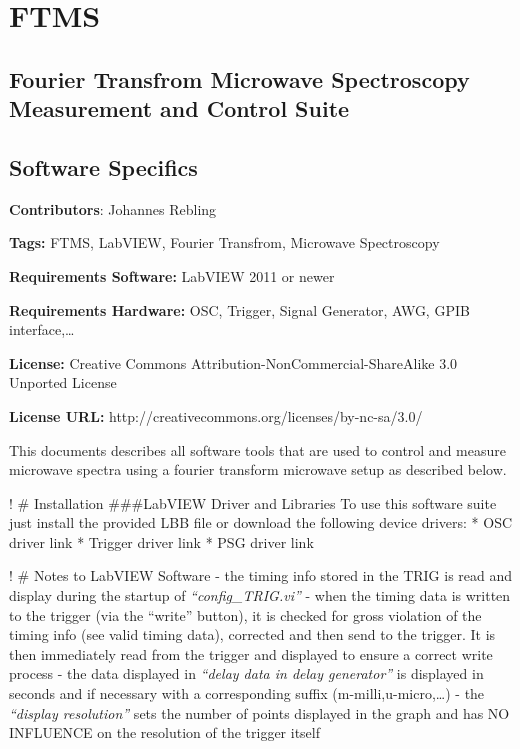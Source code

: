 \section{FTMS}

\subsection{Fourier Transfrom Microwave Spectroscopy Measurement and
Control Suite}

\subsection{Software Specifics}

\textbf{Contributors}: Johannes Rebling

\textbf{Tags:} FTMS, LabVIEW, Fourier Transfrom, Microwave Spectroscopy

\textbf{Requirements Software:} LabVIEW 2011 or newer

\textbf{Requirements Hardware:} OSC, Trigger, Signal Generator, AWG,
GPIB interface,\ldots{}

\textbf{License:} Creative Commons Attribution-NonCommercial-ShareAlike
3.0 Unported License

\textbf{License URL:} http://creativecommons.org/licenses/by-nc-sa/3.0/

This documents describes all software tools that are used to control and
measure microwave spectra using a fourier transform microwave setup as
described below.

{%
}
{%
\FL
\parbox[t]{1.00\columnwidth}{\raggedright
! \# Installation \#\#\#LabVIEW Driver and Libraries To use this
software suite just install the provided LBB file or download the
following device drivers: * OSC driver link * Trigger driver link * PSG
driver link
}
\LL
}

! \# Notes to LabVIEW Software - the timing info stored in the TRIG is
read and display during the startup of \emph{``config\_TRIG.vi''} - when
the timing data is written to the trigger (via the ``write'' button), it
is checked for gross violation of the timing info (see valid timing
data), corrected and then send to the trigger. It is then immediately
read from the trigger and displayed to ensure a correct write process -
the data displayed in \emph{``delay data in delay generator''} is
displayed in seconds and if necessary with a corresponding suffix
(m-milli,u-micro,\ldots{}) - the \emph{``display resolution''} sets the
number of points displayed in the graph and has NO INFLUENCE on the
resolution of the trigger itself


